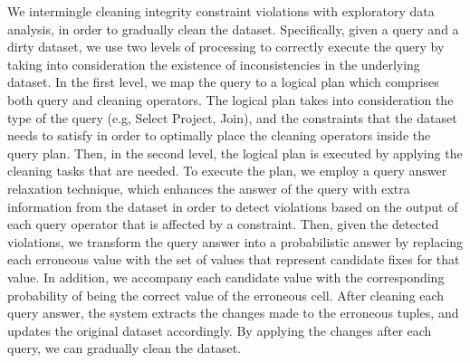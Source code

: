 
We intermingle cleaning integrity constraint violations \cite{dependencies} with exploratory data analysis, in order to gradually clean the dataset. 
Specifically, given a query and a dirty dataset, we use two levels of processing to correctly execute the query
by taking into consideration the existence of inconsistencies in the underlying dataset. In the first level, we map the query to a logical plan 
which comprises both query and cleaning operators. The logical plan
takes into consideration
the type of the query (e.g, Select Project, Join), and the constraints that the dataset needs to satisfy in order to optimally place the cleaning operators inside the query plan. 
Then, in the second level, the logical plan is executed by applying the cleaning tasks that are needed. To execute the plan, we employ a query answer relaxation technique, which enhances the answer of the query with
extra information from the dataset in order to 
detect violations based on the output of each query operator that is affected by a constraint. 
Then, given the detected violations, we transform the query answer into a probabilistic
answer by replacing each erroneous value with the set of values that represent candidate fixes for that value.
In addition, we accompany each candidate value with the corresponding probability of being the correct value of the erroneous cell. 
After cleaning each query answer, the system extracts the changes made to the erroneous
tuples, and updates the original dataset accordingly. By applying the changes after each
query, we can gradually clean the dataset.

